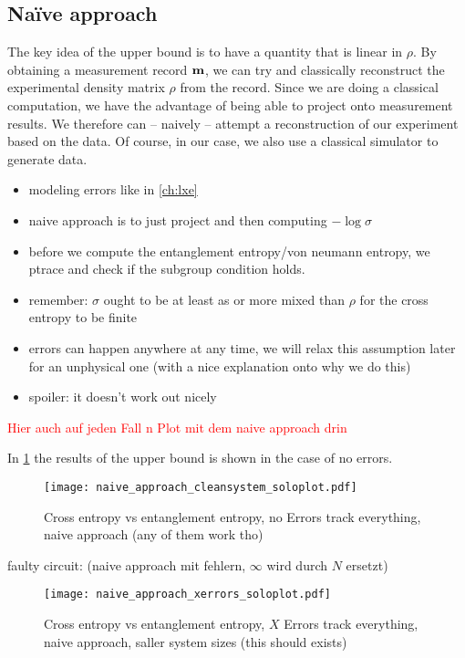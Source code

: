 \subsection{Na\"ive approach}\label{sec:naive-approach}
The key idea of the upper bound is to have a quantity that is linear in $\rho$.
By obtaining a measurement record $\vb{m}$, we can try and classically
reconstruct the experimental density matrix $\rho$ from the record. Since we
are doing a classical computation, we have the advantage of being able to
project onto measurement results. We therefore can -- naively -- attempt a
reconstruction of our experiment based on the data. Of course, in our case, we
also use a classical simulator to generate data. 
\begin{itemize}
  \item modeling errors like in \cref{ch:lxe}
  \item naive approach is to just project and then computing $-\log\sigma$
  \item before we compute the entanglement entropy/von neumann entropy, we
    ptrace and check if the subgroup condition holds.
  \item remember: $\sigma$ ought to be at least as or more mixed than $\rho$
    for the cross entropy to be finite
  \item errors can happen anywhere at any time, we will relax this assumption
    later for an unphysical one (with a nice explanation onto why we do this)
  \item spoiler: it doesn't work out nicely
\end{itemize}

\textcolor{red}{Hier auch auf jeden Fall n Plot mit dem naive approach drin}

In \cref{fig:naive-svn-vs-se-no-error} the results of the upper bound is shown
in the case of no errors.
\begin{figure}[H]
  \centering
  \texttt{[image: naive\_approach\_cleansystem\_soloplot.pdf]}
  \caption{Cross entropy vs entanglement entropy, no Errors track everything, naive approach (any of them work tho)}
  \label{fig:naive-svn-vs-se-no-error}
\end{figure}

faulty circuit: (naive approach mit fehlern, $\infty$ wird durch $N$ ersetzt)
\begin{figure}[H]
  \centering
  \texttt{[image: naive\_approach\_xerrors\_soloplot.pdf]}
  \caption{Cross entropy vs entanglement entropy, $X$ Errors track everything,
  naive approach, saller system sizes (this should exists)}
  \label{fig:naive-svn-vs-se}
\end{figure}
